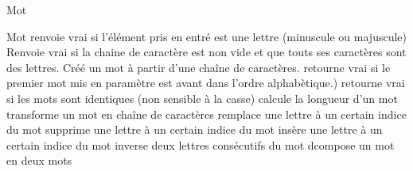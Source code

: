 \begin{tad}
	\begin{tadOperations}{Mot}
			{\tadUnParam{\caractere}}%
			{\tadUnParam{\booleen}}
			{\tadUnParam{\chaine}}%
			{\tadUnParam{\booleen}}
			{\tadUnParam{\chaine}}%
			{}
			{}%
			{\tadUnParam{\booleen}}
			{}%
			{\tadUnParam{\booleen}}
			{}%
			{}
			{}%
			{\tadUnParam{\chaine}}
			{}%
			{}
			{}%
			{}
			{}%
			{}
			{}%
			{}
			{}%
			{}
	\end{tadOperations}
	
	\begin{tadSemantiques}{Mot}
			{renvoie vrai si l'\'el\'ement pris en entr\'e est une lettre (minuscule ou majuscule)}
			{Renvoie vrai si la chaine de caract\`ere est non vide et que touts ses caract\`eres sont des lettres.}
			{Cr\'e\'e un mot \`a partir d’une cha\^ine de caract\`eres.}
			{retourne vrai si le premier mot mis en param\`etre est avant dans l'ordre alphab\`etique.)}
			{retourne vrai si les mots sont identiques (non sensible à la casse)}
			{calcule la longueur d'un mot}
			{transforme un mot en cha\^ine de caract\`eres}
			{remplace une lettre \`a un certain indice du mot}
			{supprime une lettre \`a un certain indice du mot}
			{ins\`ere une lettre \`a un certain indice du mot}
			{inverse deux lettres cons\'ecutifs du mot}
			{dcompose un mot en deux mots}
	\end{tadSemantiques}
	

\end{tad}
